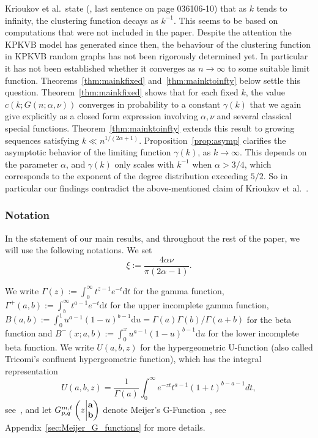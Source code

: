 Krioukov et al.~state (\cite{krioukov2010hyperbolic}, last sentence on page 036106-10) that as $k$ tends to infinity, the clustering function decays as $k^{-1}$. This seems to be based on computations that were not included in the paper.
Despite the attention the KPKVB model has generated since then, the behaviour of the clustering function in KPKVB random graphs has not been rigorously determined yet. In particular it has not been established whether it converges as $n\to\infty$ to some suitable limit function.  
Theorems~\ref{thm:mainkfixed} and~\ref{thm:mainktoinfty} below settle this question. Theorem~\ref{thm:mainkfixed} shows that for each fixed $k$, the value $c(k;G(n;\alpha,\nu))$ converges in probability to a constant $\gamma(k)$ that we again give explicitly as a closed form expression involving $\alpha,\nu$ and several classical special functions. Theorem~\ref{thm:mainktoinfty} extends this result to growing sequences satisfying $k \ll n^{1/(2\alpha+1)}$. Proposition~\ref{prop:asymp} clarifies the asymptotic behavior of the limiting function $\gamma(k)$, as $k\to\infty$. This depends on the parameter $\alpha$, and $\gamma(k)$ only scales with $k^{-1}$ when $\alpha > 3/4$, which corresponds to the exponent of the degree distribution exceeding $5/2$. 
So in particular our findings contradict the above-mentioned claim of Krioukov et al.~\cite{krioukov2010hyperbolic}.


\subsubsection*{Notation}

In the statement of our main results, and throughout the rest of the paper, we will use the following notations. 
We set 
$$\xi := \frac{4\alpha\nu}{\pi(2\alpha-1)}. $$

We write $\Gamma(z) := \int_0^\infty t^{z-1} e^{-t}\text{d}t$ for the gamma function, 
$\Gamma^+(a,b) := \int_b^\infty t^{a-1} e^{-t}\text{d}t$ for the upper incomplete gamma function, 
 $B(a,b) := \int_0^1 u^{a-1}(1-u)^{b-1}\text{d}u = \Gamma(a)\Gamma(b) / \Gamma(a+b)$ for the beta function and 
 $B^-(x ; a,b) := \int_0^x u^{a-1}(1-u)^{b-1}\text{d}u$ for the lower incomplete beta function. 
We write $U(a,b,z)$ for the hypergeometric U-function (also called Tricomi's confluent hypergeometric function), which 
has the integral representation 
\[
	U(a,b,z) = \frac{1}{\Gamma(a)} \int_0^\infty e^{-zt} t^{a-1} (1+t)^{b-a-1} dt,
\] 
see~\cite[p.255 Equation (2)]{erdelyi1953higher}, and let $\MeijerGnew{m}{\ell}{p}{q}{{\bf a}}{{\bf b}}{z}$ denote 
Meijer's G-Function~\cite{meijer1946gfunction}, see Appendix~\ref{sec:Meijer_G_functions} for more details.

